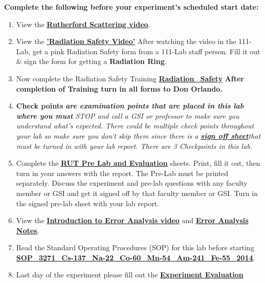 \documentclass{../lab}
\begin{document}
\textbf{Complete the following before your experiment's scheduled start date:}

\begin{enumerate}
    \item View the \href{http://youtu.be/xHzzXiMEmaU}{\textbf{Rutherford Scattering video}}.

    \item View the \href{http://youtu.be/KHxtzF5pZZM}{\textbf{'\textbf{Radiation Safety Video'}}} After watching the video in the 111-Lab, get a pink Radiation Safety form from a 111-Lab staff person. Fill it out \& sign the form for getting a \textbf{Radiation Ring}.

    \item Now complete the Radiation Safety Training \href{http://experimentationlab.berkeley.edu/RadiationSafety}{\textbf{Radiation\_Safety}} \textbf{After completion of Training turn in all forms to Don Orlando.}

    \item \textbf{Check points} \emph{\textbf{are examination points that are placed in this lab where you must }}\emph{STOP and call a GSI or professor to make sure you understand what's expected. There could  be multiple check points throughout your lab so make sure you don't skip them since there is a \href{http://experimentationlab.berkeley.edu/rutcheckpoints}{\textbf{sign off sheet}}that must be turned in with your lab report. There are 3 Checkpoints in this lab.}

    \item Complete the \href{http://experimentationlab.berkeley.edu/RUTPreLab}{\textbf{RUT Pre Lab and Evaluation}} sheets. Print,  fill it out, then turn in your answers with the report. The Pre-Lab must be printed separately. Discuss the experiment and pre-lab questions with any faculty member or GSI and get it signed off by that faculty member or GSI. Turn in the signed pre-lab sheet with your lab report.

    \item View the \href{\ErrorAnalysisVideo}{\textbf{Introduction to Error Analysis video}} and \href{http://dev-physicsadv.pantheon.berkeley.edu/EAX}{\textbf{Error Analysis Notes}}.

    \item Read the Standard Operating Procedures (SOP) for this lab before starting \href{http://experimentationlab.berkeley.edu/sites/default/files/images/SOP\_3271\_Cs-137\_Na-22\_Co-60\_Mn-54\_Am-241\_Fe-55\_2014.pdf}{\textbf{SOP\_3271\_Cs-137\_Na-22\_Co-60\_Mn-54\_Am-241\_Fe-55\_2014}}.

    \item Last day of the experiment please fill out the \href{\ExperimentEvaluation}{\textbf{Experiment Evaluation}}

\end{enumerate}
\end{document}
